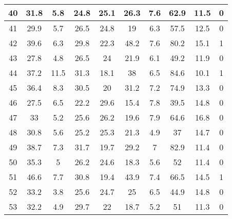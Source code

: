 \begin{longtable} {|c|c|c|c|c|c|c|c|c|c|}
40                            &        31.8&         5.8&        24.8&        25.1&        26.3&         7.6&        62.9&        11.5&           0\\\hline
41                            &        29.9&         5.7&        26.5&        24.8&          19&         6.3&        57.5&        12.5&           0\\\hline
42                            &        39.6&         6.3&        29.8&        22.3&        48.2&         7.6&        80.2&        15.1&           1\\\hline
43                            &        27.8&         4.8&        26.5&          24&        21.9&         6.1&        49.2&        11.9&           0\\\hline
44                            &        37.2&        11.5&        31.3&        18.1&          38&         6.5&        84.6&        10.1&           1\\\hline
45                            &        36.4&         8.3&        30.5&          20&        31.2&         7.2&        74.9&        13.3&           0\\\hline
46                            &        27.5&         6.5&        22.2&        29.6&        15.4&         7.8&        39.5&        14.8&           0\\\hline
47                            &          33&         5.2&        25.6&        26.2&        19.6&         7.9&        64.6&        16.8&           0\\\hline
48                            &        30.8&         5.6&        25.2&        25.3&        21.3&         4.9&          37&        14.7&           0\\\hline
49                            &        38.7&         7.3&        31.7&        19.7&        29.2&           7&        82.9&        11.4&           0\\\hline
50                            &        35.3&           5&        26.2&        24.6&        18.3&         5.6&          52&        11.4&           0\\\hline
51                            &        46.6&         7.7&        30.8&        19.4&        43.9&         7.4&        66.5&        14.5&           1\\\hline
52                            &        33.2&         3.8&        25.6&        24.7&          25&         6.5&        44.9&        14.8&           0\\\hline
53                            &        32.2&         4.9&        29.7&          22&        18.7&         5.2&          51&        11.3&           0\\\hline

\end{longtable}
